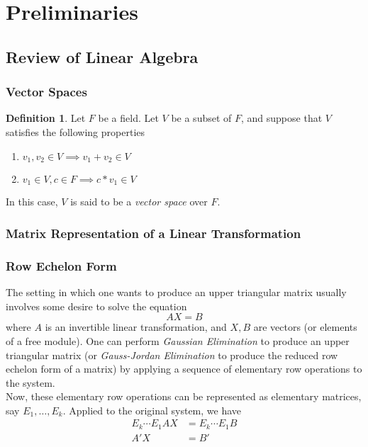 \documentclass{amsart}
\theoremstyle{definition}
\newtheorem{definition}[theorem]{Definition}
\theoremstyle{remark}
\numberwithin{equation}{section}
\begin{document}
\section{Preliminaries}

\subsection{Review of Linear Algebra}

\subsubsection{Vector Spaces}

\begin{definition}
    Let $F$ be a field. Let $V$ be a subset of $F$, and suppose that $V$
    satisfies the following properties
    \begin{enumerate}[i]
        \item $v_1, v_2 \in V \implies v_1 + v_2 \in V$
        \item $v_1 \in V, c \in F \implies c * v_1 \in V$
    \end{enumerate}
    In this case, $V$ is said to be a \emph{vector space} over $F$.
\end{definition}

\subsubsection{Matrix Representation of a Linear Transformation}

\subsubsection{Row Echelon Form}

The setting in which one wants to produce an upper triangular matrix usually involves some desire to solve the equation
    \begin{equation*}
      AX = B
    \end{equation*}
    where $A$ is an invertible linear transformation, and $X, B$ are vectors (or elements of a free module). One can perform \emph{Gaussian Elimination} to produce an upper triangular matrix (or \emph{Gauss-Jordan Elimination} to produce the reduced row echelon form of a matrix) by applying a sequence of elementary row operations to the system. \\

    Now, these elementary row operations can be represented as elementary matrices, say $E_1, \ldots, E_k$. Applied to the original system, we have
    \begin{align*}
      E_k \cdots E_1 AX &= E_k \cdots E_1 B\\
      A'X &= B'
    \end{align*}
\end{document}
